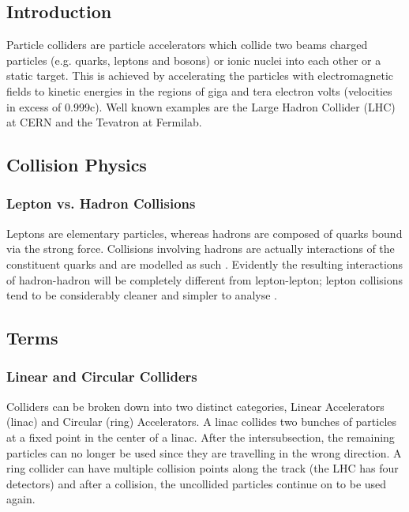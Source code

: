  \subsection{Introduction}
 
 Particle colliders are particle accelerators which collide two beams charged particles (e.g. quarks, leptons and bosons) or ionic nuclei into each other or a static target. This is achieved by accelerating the particles with electromagnetic fields to kinetic energies in the regions of giga and tera electron volts (velocities in excess of 0.999c). Well known examples are the Large Hadron Collider (LHC) at CERN and the Tevatron at Fermilab.
 
 \subsection{Collision Physics}
 
 \subsubsection{Lepton vs. Hadron Collisions}
 
 Leptons are elementary particles, whereas hadrons are composed of quarks bound via the strong force. Collisions involving hadrons are actually interactions of the constituent quarks and are modelled as such \cite{?}. Evidently the resulting interactions of hadron-hadron will be completely different from lepton-lepton; lepton collisions tend to be considerably cleaner and simpler to analyse \cite{?}.
 
 \subsection{Terms}
 
 \subsubsection{Linear and Circular Colliders}
 
 Colliders can be broken down into two distinct categories, Linear Accelerators (linac) and Circular (ring) Accelerators.
 A linac collides two bunches of particles at a fixed point in the center of a linac. After the intersubsection, the remaining particles can no longer be used since they are travelling in the wrong direction. A ring collider can have multiple collision points along the track (the LHC has four detectors) and after a collision, the uncollided particles continue on to be used again.  
 
